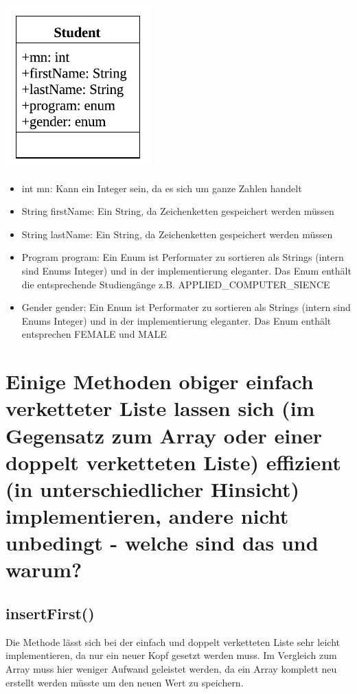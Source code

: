 \documentclass[a4paper, 11pt]{article}
\begin{document}
\begin{center}
    \includegraphics[width=0.5\linewidth]{img/pdf/Student}
\end{center}

\begin{itemize}
    \item int mn: Kann ein Integer sein, da es sich um ganze Zahlen handelt
    \item String firstName: Ein String, da Zeichenketten gespeichert werden müssen
    \item String lastName: Ein String, da Zeichenketten gespeichert werden müssen
    \item Program program: Ein Enum ist Performater zu sortieren als Strings (intern sind Enums Integer) und in der implementierung eleganter.
Das Enum enthält die entsprechende Studiengänge z.B. APPLIED\_COMPUTER\_SIENCE
    \item Gender gender: Ein Enum ist Performater zu sortieren als Strings (intern sind Enums Integer) und in der implementierung eleganter.
Das Enum enthält entsprechen FEMALE und MALE
\end{itemize}

\pagebreak

\section*{Einige Methoden obiger einfach verketteter Liste lassen sich (im Gegensatz zum
          Array oder einer doppelt verketteten Liste) effizient (in unterschiedlicher Hinsicht)
          implementieren, andere nicht unbedingt - welche sind das und warum?}

\subsection*{insertFirst()}
Die Methode lässt sich bei der einfach und doppelt verketteten Liste sehr leicht implementieren, da nur ein neuer Kopf
gesetzt werden muss. Im Vergleich zum Array muss hier weniger Aufwand geleistet werden, da ein Array komplett neu
erstellt werden müsste um den neuen Wert zu speichern.
\end{document}

